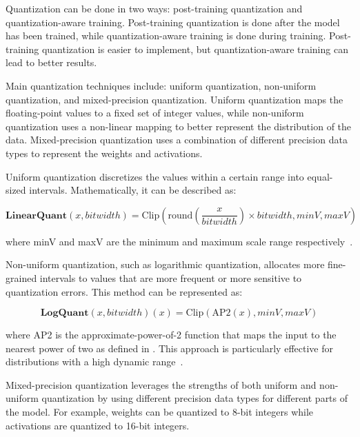 Quantization can be done in two ways: post-training quantization and quantization-aware training.
Post-training quantization is done after the model has been trained, while quantization-aware training is done during training.
Post-training quantization is easier to implement, but quantization-aware training can lead to better results.

Main quantization techniques include: uniform quantization, non-uniform quantization, and mixed-precision quantization.
Uniform quantization maps the floating-point values to a fixed set of integer values, while non-uniform quantization uses a non-linear mapping to better represent the distribution of the data.
Mixed-precision quantization uses a combination of different precision data types to represent the weights and activations.

Uniform quantization discretizes the values within a certain range into equal-sized intervals.
Mathematically, it can be described as:

\begin{equation}
	\textbf{LinearQuant}(x, bitwidth) = \text{Clip}(\text{round}(\frac{x}{bitwidth}) \times bitwidth, minV, maxV)
	\label{eq:uniform-quantization}
\end{equation}

\noindent where minV and maxV are the minimum and maximum scale range respectively~\cite{hubara2017quantized}.

Non-uniform quantization, such as logarithmic quantization, allocates more fine-grained intervals to values that are more frequent or more sensitive to quantization errors.
This method can be represented as:

\begin{equation}
	\textbf{LogQuant}(x, bitwidth)(x) = \text{Clip}(\text{AP2}(x), minV, maxV)
	\label{eq:non-uniform-quantization}
\end{equation}

\noindent where AP2 is the approximate-power-of-2 function that maps the input to the nearest power of two as defined in \textcite{hubara2017quantized}.
This approach is particularly effective for distributions with a high dynamic range~\cite{miyashita2016convolutional}.

Mixed-precision quantization leverages the strengths of both uniform and non-uniform quantization by using different precision data types for different parts of the model.
For example, weights can be quantized to 8-bit integers while activations are quantized to 16-bit integers.

